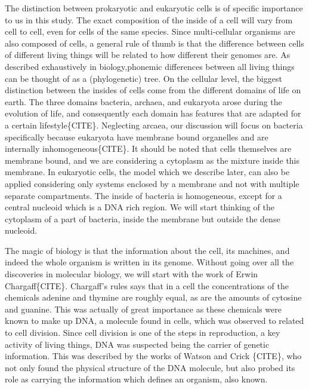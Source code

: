 \documentclass[draft, english]{volcanica-template}
\begin{document}
The distinction between prokaryotic and eukaryotic cells is of specific importance to us in this study. The exact composition of the inside of a cell will vary from cell to cell, even for cells of the same species. Since multi-cellular organisms are also composed of cells, a general rule of thumb is that the difference between cells of different living things will be related to how different their genomes are. As described exhaustively in biology,phonemic differences between all living things can be thought of as a (phylogenetic) tree. On the cellular level, the biggest distinction between the insides of cells come from the different domains of life on earth. The three domains bacteria, archaea, and eukaryota arose during the evolution of life, and consequently each domain has features that are adapted for a certain lifestyle\{CITE\}. Neglecting arcaea, our discussion will focus on bacteria specifically because eukaryota have membrane bound organelles and are internally inhomogeneous\{CITE\}. It should be noted that cells themselves are membrane bound, and we are considering a cytoplasm as the mixture inside this membrane. In eukaryotic cells, the model which we describe later, can also be applied considering only systems enclosed by a membrane and not with multiple separate compartments. The inside of bacteria is homogeneous, except for a central nucleoid which is a DNA rich region. We will start thinking of the cytoplasm of a part of bacteria, inside the membrane but outside the dense nucleoid.

The magic of biology is that the information about the cell, its machines, and indeed the whole organism is written in its genome. Without going over all the discoveries in molecular biology, we will start with the work of Erwin Chargaff\{CITE\}.  Chargaff's rules says that in a cell the concentrations of the chemicals adenine  and thymine are roughly equal, as are the amounts of cytosine and guanine. This was actually of great importance as these chemicals were known to make up DNA, a molecule found in cells, which was observed to related to cell division. Since cell division is one of the steps in reproduction, a key activity of living things, DNA was suspected being the carrier of genetic information. This was described by the works of Watson and Crick \{CITE\}, who not only found the physical structure of the DNA molecule, but also probed its role as carrying the information which defines an organism, also known.
\end{document}
